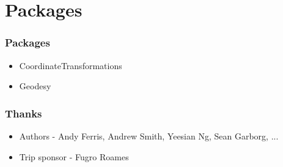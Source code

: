 \documentclass{beamer}
\newcommand{\vf}[1]{\vskip0pt plus #1}
\begin{document}



\section{Packages}

\begin{frame}
  \frametitle{Packages}
  \begin{itemize}
    \item
      CoordinateTransformations
    \item
      Geodesy
  \end{itemize}
\end{frame}

\begin{frame}
  \frametitle{Thanks}
  \begin{itemize}
    \item
      Authors - Andy Ferris, Andrew Smith, Yeesian Ng, Sean Garborg, ...
    \item
      Trip sponsor - Fugro Roames
  \end{itemize}
\end{frame}
\end{document}
